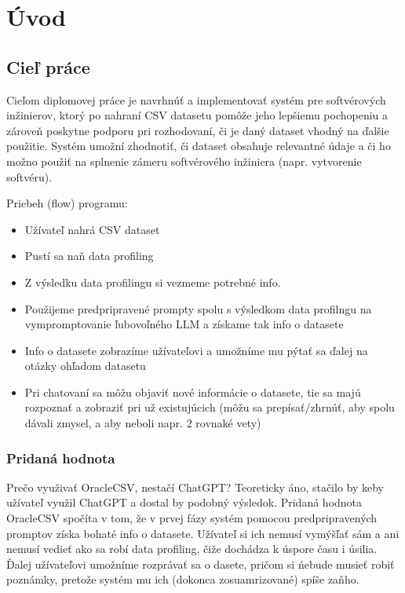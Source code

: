 \chapter*{Úvod}

\section{Cieľ práce}

Cieľom diplomovej práce je navrhnúť a implementovať systém pre softvérových inžinierov, ktorý po nahraní CSV datasetu pomôže jeho lepšiemu pochopeniu a zároveň poskytne podporu pri rozhodovaní, či je daný dataset vhodný na ďalšie použitie. Systém umožní zhodnotiť, či dataset obsahuje relevantné údaje a či ho možno použiť na splnenie zámeru softvérového inžiniera (napr. vytvorenie softvéru).

Priebeh (flow) programu:
\begin{itemize}
\item Užívateľ nahrá CSV dataset
\item Pustí sa naň data profiling
\item Z výsledku data profilingu si vezmeme potrebné info.
\item Použijeme predpripravené prompty spolu s výsledkom data profilngu na vympromptovanie ľubovoľného LLM a získame tak info o datasete
\item Info o datasete zobrazíme užívateľovi a umožníme mu pýtať sa ďalej na otázky ohľadom datasetu
\item Pri chatovaní sa môžu objaviť nové informácie o datasete, tie sa majú rozpoznať a zobraziť pri už existujúcich (môžu sa prepísať/zhrnúť, aby spolu dávali zmysel, a aby neboli napr. 2 rovnaké vety)
\end{itemize}

\subsection{Pridaná hodnota}

Prečo využivať OracleCSV, nestačí ChatGPT? Teoreticky áno, stačilo by keby užívateľ využil ChatGPT a dostal by podobný výsledok. Pridaná hodnota OracleCSV spočíta v tom, že v prvej fázy systém pomocou predpripravených promptov získa bohaté info o datasete. Užívateľ si ich nemusí vymýšľať sám a ani nemusí vedieť ako sa robí data profiling, čiže dochádza k úspore času i úsilia. Ďalej užívateľovi umožníme rozprávať sa o dasete, pričom si ńebude musieť robiť poznámky, pretože systém mu ich (dokonca zosuamrizované) spíše zaňho.

